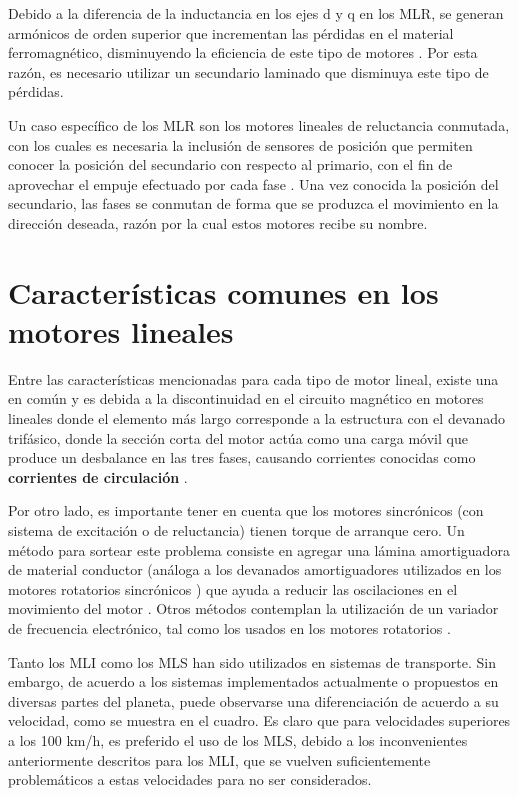 Debido a la diferencia de la inductancia en los ejes d y q en los MLR, se generan armónicos de orden superior que incrementan las pérdidas en el material ferromagnético, disminuyendo la eficiencia de este tipo de motores \cite{boldea2013}. Por esta razón, es necesario utilizar un secundario laminado que disminuya este tipo de pérdidas.

Un caso específico de los MLR son los motores lineales de reluctancia conmutada, con los cuales es necesaria la inclusión de sensores de posición que permiten conocer la posición del secundario con respecto al primario, con el fin de aprovechar el empuje efectuado por cada fase \cite{boldea2013}. Una vez conocida la posición del secundario, las fases se conmutan de forma que se produzca el movimiento en la dirección deseada, razón por la cual estos motores recibe su nombre.

\section{Características comunes en los motores lineales}
 
Entre las características mencionadas para cada tipo de motor lineal, existe una en común y es debida a la discontinuidad en el circuito magnético en motores lineales donde el elemento más largo corresponde a la estructura con el devanado trifásico, donde la sección corta del motor actúa como una carga móvil que produce un desbalance en las tres fases, causando corrientes conocidas como \textbf{corrientes de circulación} \cite{jang2010}.

Por otro lado, es importante tener en cuenta que los motores sincrónicos (con sistema de excitación o de reluctancia) tienen torque de arranque cero. Un método para sortear este problema consiste en agregar una lámina amortiguadora de material conductor (análoga a los devanados amortiguadores utilizados en los motores rotatorios sincrónicos \cite{chapman2003}) que ayuda a reducir las oscilaciones en el movimiento del motor \cite{gieras2000}. Otros métodos contemplan la utilización de un variador de frecuencia electrónico, tal como los usados en los motores rotatorios \cite{chapman2003}.

Tanto los MLI como los MLS han sido utilizados en sistemas de transporte. Sin embargo, de acuerdo a los sistemas implementados actualmente o propuestos en diversas partes del planeta, puede observarse una diferenciación de acuerdo a su velocidad, como se muestra en el cuadro. Es claro que para velocidades superiores a los 100 km/h, es preferido el uso de los MLS, debido a los inconvenientes anteriormente descritos para los MLI, que se vuelven suficientemente problemáticos a estas velocidades para no ser considerados.

